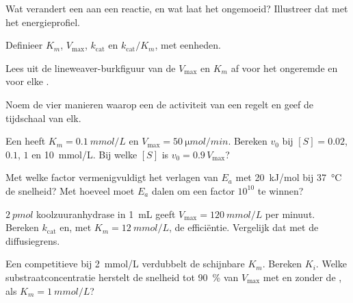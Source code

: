 \begin{exercise}[$\star$]\label{exo:b1:enzymes:1}
Wat verandert een  aan een reactie, en wat laat het ongemoeid? Illustreer dat
met het energieprofiel.
\end{exercise}

\begin{exercise}[$\star$]\label{exo:b1:enzymes:2}
Definieer $K_m$, $V_{\max}$, $k_{\text{cat}}$ en $k_{\text{cat}}/K_m$, met
eenheden.
\end{exercise}

\begin{exercise}[$\star$]\label{exo:b1:enzymes:3}
Lees uit de lineweaver-burkfiguur van de  $V_{\max}$ en $K_m$ af voor het
ongeremde  en voor elke .
\end{exercise}

\begin{exercise}[$\star$]\label{exo:b1:enzymes:4}
Noem de vier manieren waarop een  de activiteit van een  regelt en geef de
tijdschaal van elk.
\end{exercise}

\begin{exercise}[$\star\star$]\label{exo:b1:enzymes:5}
Een  heeft $K_m = \qty{0.1}{mmol/L}$ en $V_{\max} =
\qty{50}{\micro mol/min}$. Bereken $v_0$ bij $[S] = 0.02$, $0.1$, $1$ en
\qty{10}{mmol/L}. Bij welke $[S]$ is $v_0 = 0.9\,V_{\max}$?
\end{exercise}

\begin{exercise}[$\star\star$]\label{exo:b1:enzymes:6}
Met welke factor vermenigvuldigt het verlagen van $E_a$ met \qty{20}{kJ/mol} bij
\qty{37}{\celsius} de snelheid? Met hoeveel moet $E_a$ dalen om een factor
$10^{10}$ te winnen?
\end{exercise}

\begin{exercise}[$\star\star$]\label{exo:b1:enzymes:7}
$\qty{2}{pmol}$ koolzuuranhydrase in \qty{1}{mL} geeft
$V_{\max} = \qty{120}{mmol/L}$ per minuut. Bereken $k_{\text{cat}}$ en, met
$K_m = \qty{12}{mmol/L}$, de efficiëntie. Vergelijk dat met de diffusiegrens.
\end{exercise}

\begin{exercise}[$\star\star$]\label{exo:b1:enzymes:8}
Een competitieve  bij \qty{2}{mmol/L} verdubbelt de schijnbare $K_m$.
Bereken $K_i$. Welke substraatconcentratie herstelt de snelheid tot \qty{90}{\%}
van $V_{\max}$ met en zonder de , als $K_m = \qty{1}{mmol/L}$?
\end{exercise}

